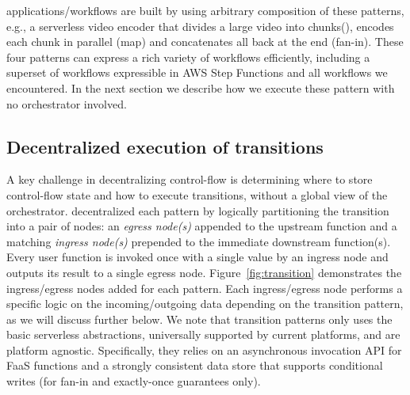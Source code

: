 \name{} applications/workflows are built by using arbitrary composition of  these patterns, e.g., a serverless video encoder that divides a large
video into chunks(), encodes each chunk in parallel (map) and concatenates all back
at the end (fan-in).
These four patterns  can express a rich variety of workflows
efficiently, including a superset of workflows expressible in AWS Step
Functions and all workflows we encountered. In the next section we describe how we execute these pattern with no orchestrator involved.

\subsection{Decentralized execution of transitions}
\label{sec:transition-execution}

A key challenge in decentralizing control-flow is determining where to store
control-flow state and how to execute transitions, without a global view of the orchestrator. \name{} decentralized each pattern by logically partitioning the transition into a pair of nodes:  an \textit{egress node(s)} appended to the
upstream function and a matching \textit{ingress node(s)} prepended to the immediate
downstream function(s).  Every user function is invoked once with a
single value by an ingress node and outputs its result to a single egress
node.  Figure~\ref{fig:transition} demonstrates the ingress/egress nodes added for each pattern. Each ingress/egress node performs a specific logic on the incoming/outgoing data depending on the transition pattern,  as we will discuss further below.  We note that transition patterns only uses the basic serverless abstractions, universally supported by current platforms, and are platform agnostic.
Specifically, they relies
on an asynchronous invocation API for FaaS functions and a strongly consistent
data store that supports conditional writes (for fan-in and exactly-once guarantees only). 



